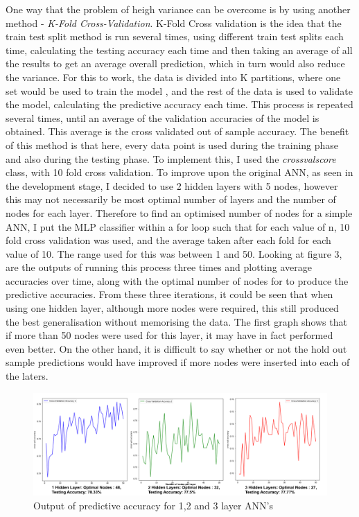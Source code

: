 \documentclass[11pt]{article}
\begin{document}
One way that the problem of heigh variance can be overcome is by using another method - \textit{K-Fold Cross-Validation}. K-Fold Cross validation is the idea that the train test split method is run several times, using different train test splits each time, calculating the testing accuracy each time and then taking an average of all the results to get an average overall prediction, which in turn would also reduce the variance. For this to work, the data is divided into K partitions, where one set would be used to train the model , and the rest of the data is used to validate the model, calculating the predictive accuracy each time. This process is repeated several times, until an average of the validation accuracies of the model is obtained. This average is the cross validated out of sample accuracy.  The benefit of this method is that here, every data point is used during the training phase and also during the testing phase. To implement this, I used the \textit{cross\textunderscore val\textunderscore score} class, with 10 fold cross validation. To improve upon the original ANN, as seen in the development stage, I decided to use 2 hidden layers with 5 nodes, however this may not necessarily be most optimal number of layers and the number of nodes for each layer. Therefore to find an optimised number of nodes for a simple ANN, I put the MLP classifier within a for loop such that for each value of n, 10 fold cross validation was used, and the average taken after each fold for each value of 10. The range used for this was between 1 and 50. Looking at figure 3, are the outputs of running this process three times and plotting average accuracies over time, along with the optimal number of nodes for to produce the predictive accuracies. From these three iterations, it could be seen that when using one hidden layer, although more nodes were required, this still produced the best generalisation without memorising the data. The first graph shows that if more than 50 nodes were used for this layer, it may have in fact performed even better. On the other hand, it is difficult to say whether or not the hold out sample predictions would have improved if more nodes were inserted into each of the laters. 
\begin{figure}[h]
\centering
\includegraphics[scale = .50]{graph}
\caption{Output of predictive accuracy for 1,2 and 3 layer ANN's} 
\end{figure}
\end{document}
